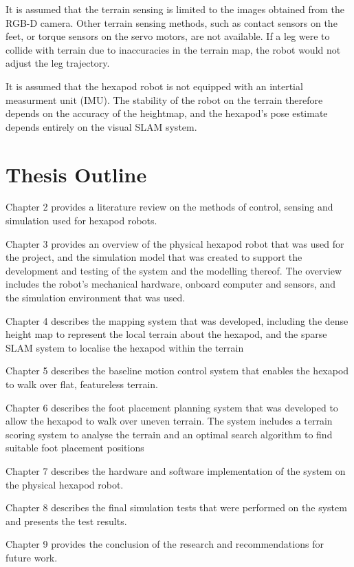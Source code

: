     It is assumed that the terrain sensing is limited to the images obtained from the RGB-D camera. Other terrain
    sensing methods, such as contact sensors on the feet, or torque sensors on the servo motors, are not available.
    If a leg were to collide with terrain due to inaccuracies in the terrain map, the robot would not adjust the leg trajectory.

    It is assumed that the hexapod robot is not equipped with an intertial measurment unit (IMU). The stability of the
    robot on the terrain therefore depends on the accuracy of the heightmap, and the hexapod's pose estimate depends
    entirely on the visual SLAM system.

\section{Thesis Outline}

    Chapter 2 provides a literature review on the methods of control, sensing and simulation used for hexapod robots.

    Chapter 3 provides an overview of the physical hexapod robot that was used for the project, and the simulation model that was created to
    support the development and testing of the system and the modelling thereof. The overview includes the robot's mechanical hardware,
    onboard computer and sensors, and the simulation environment that was used.

    Chapter 4 describes the mapping system that was developed, including the dense height map to represent
    the local terrain about the hexapod, and the sparse SLAM system to localise the hexapod within the terrain

    Chapter 5 describes the baseline motion control system that enables the hexapod to walk over flat, featureless terrain.

    Chapter 6 describes the foot placement planning system that was developed to allow the hexapod to walk over
    uneven terrain. The system includes a terrain scoring system to analyse the terrain and an optimal search algorithm to find suitable foot placement positions

    Chapter 7 describes the hardware and software implementation of the system on the physical hexapod robot.

    Chapter 8 describes the final simulation tests that were performed on the system and presents the test results.

    Chapter 9 provides the conclusion of the research and recommendations for future work.
